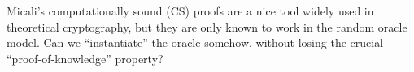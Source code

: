 \documentclass[12pt,twoside]{article}
\theoremstyle{plain}
\begin{document}
Micali's computationally sound (CS) proofs are a nice tool widely used in
theoretical cryptography, but they are only known to work in the random oracle
model. Can we ``instantiate'' the oracle somehow, without losing the crucial
``proof-of-knowledge'' property?




\end{document}
